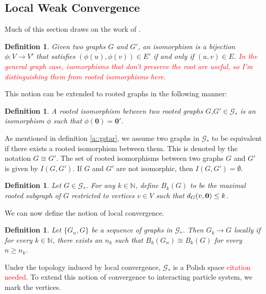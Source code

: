 \documentclass[12pt]{article}
\newcommand{\mb}{\mathbb}
\newcommand{\mc}{\mathcal}
\newcommand{\ra}{\rightarrow}
\newcommand{\tr}{\textcolor{red}}
\renewcommand{\root}{\mathbf{0}}					%
\newcommand{\met}[2]{
\ifstrempty{#2}{
	d_{#1}}{
	d_{#1,#2}}}										%
\newcommand{\Gs}{\mc{G}_\ast}						%
\newcommand{\iso}{I}								%
\newcommand{\trnc}[1]{B_{#1}}						%
\renewcommand{\it}[1]{_{#1}}						%
\newtheorem{defn}[thms]{Definition}
\begin{document}
\subsection{Local Weak Convergence}
\label{awl::lwc}

Much of this section draws on the work of \cite{LacRamWu19}.

\begin{defn}
Given two graphs \(G\) and \(G'\), an isomorphism is a bijection \(\phi: V \ra V'\) that satisfies \((\phi(u),\phi(v)) \in E'\) if and only if \((u,v) \in E\). \tr{In the general graph case, isomorphisms that don't preserve the root are useful, so I'm distinguishing them from rooted isomorphisms here.}
\label{lwc::iso}
\end{defn}

This notion can be extended to rooted graphs in the following manner:

\begin{defn}
A rooted isomorphism between two rooted graphs \(G\),\(G' \in \Gs\) is an isomorphism \(\phi\) such that \(\phi(\root) = \root'\).
\label{lwc::riso}
\end{defn}

As mentioned in definition \ref{a::gstar}, we assume two graphs in \(\Gs\) to be equivalent if there exists a rooted isomorphism between them. This is denoted by the notation \(G \cong G'\). The set of rooted isomorphisms between two graphs \(G\) and \(G'\) is given by \(\iso(G,G')\). If \(G\) and \(G'\) are not isomorphic, then \(\iso(G,G') = \emptyset\).

\begin{defn}
Let \(G \in \Gs\). For any \(k \in \mb{N}\), define \(\trnc{k}(G)\) to be the maximal rooted subgraph of \(G\) restricted to vertices \(v \in V\) such that \(\met{G}{}(v,\root) \leq k\).
\label{lwc::trnc}
\end{defn}

We can now define the notion of local convergence.

\begin{defn}
Let \(\{G\it{n},G\}\) be a sequence of graphs in \(\Gs\). Then \(G\it{k} \ra G\) locally if for every \(k \in \mb{N}\), there exists an \(n_k\) such that \(\trnc{k}(G\it{n}) \cong \trnc{k}(G)\) for every \(n \geq n_k\).
\label{lwc::lc}
\end{defn}

Under the topology induced by local convergence, \(\Gs\) is a Polish space \tr{citation needed}. To extend this notion of convergence to interacting particle system, we mark the vertices.
\end{document}
